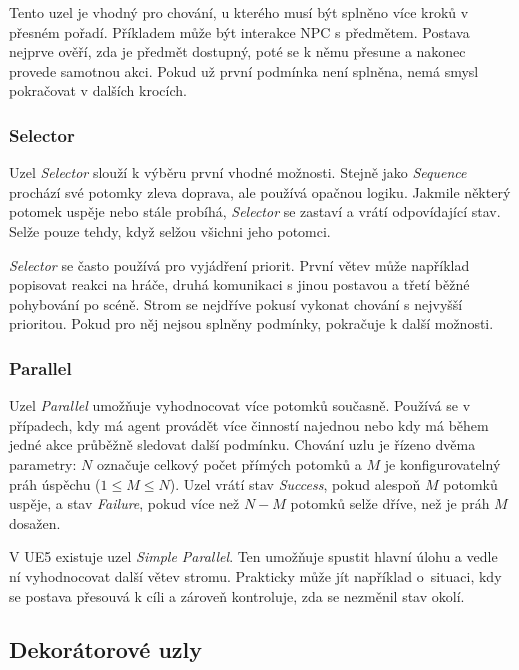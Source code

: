 Tento uzel je vhodný pro chování, u kterého musí být splněno více kroků v přesném pořadí. 
Příkladem může být interakce NPC s předmětem. 
Postava nejprve ověří, zda je předmět dostupný, poté se k němu přesune a nakonec provede samotnou akci. 
Pokud už první podmínka není splněna, nemá smysl pokračovat v dalších krocích.

\subsubsection{Selector}

Uzel \textit{Selector} slouží k výběru první vhodné možnosti. 
Stejně jako \textit{Sequence} prochází své potomky zleva doprava, ale používá opačnou logiku. 
Jakmile některý potomek uspěje nebo stále probíhá, \textit{Selector} se zastaví a vrátí odpovídající stav. 
Selže pouze tehdy, když selžou všichni jeho potomci.~\cite[s.~7]{colledanchise2018}

\textit{Selector} se často používá pro vyjádření priorit. 
První větev může například popisovat reakci na hráče, druhá komunikaci s jinou postavou a třetí běžné pohybování po scéně. 
Strom se nejdříve pokusí vykonat chování s nejvyšší prioritou. 
Pokud pro něj nejsou splněny podmínky, pokračuje k další možnosti.

\subsubsection{Parallel}

Uzel \textit{Parallel} umožňuje vyhodnocovat více potomků současně.
Používá se v případech, kdy má agent provádět více činností najednou nebo kdy má během jedné akce průběžně sledovat další podmínku.
Chování uzlu je řízeno dvěma parametry: $N$ označuje celkový počet přímých potomků a $M$ je konfigurovatelný práh úspěchu ($1 \leq M \leq N$). 
Uzel vrátí stav \textit{Success}, pokud alespoň $M$ potomků uspěje, a stav \textit{Failure}, pokud více než $N - M$ potomků selže dříve, než je práh $M$ dosažen.\cite[s.~7]{colledanchise2018}

V UE5 existuje uzel \textit{Simple Parallel}. 
Ten umožňuje spustit hlavní úlohu a vedle ní vyhodnocovat další větev stromu.\cite[s.~76]{butler2023} 
Prakticky může jít například o~situaci, kdy se postava přesouvá k cíli a zároveň kontroluje, zda se nezměnil stav okolí.

\subsection{Dekorátorové uzly}
\label{subsec:decorators}

